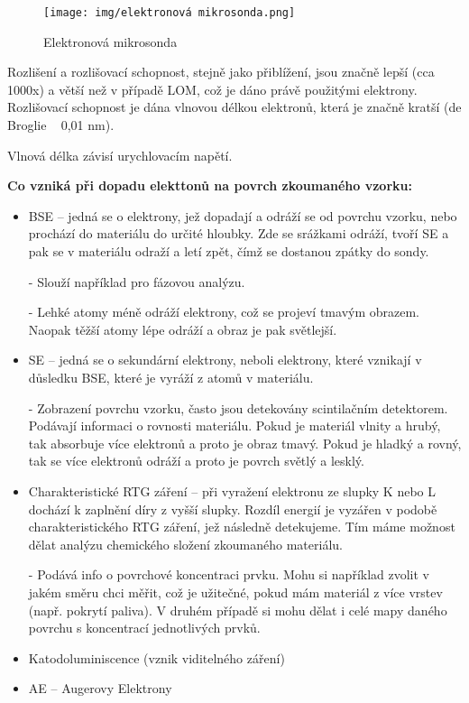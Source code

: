 \begin{figure}[H]
    \centering
    \texttt{[image: img/elektronová mikrosonda.png]}
    \caption{Elektronová mikrosonda}
\end{figure}

Rozlišení a rozlišovací schopnost, stejně jako přiblížení, jsou značně lepší (cca 1000x) a větší než v případě LOM, což je dáno právě použitými elektrony. Rozlišovací schopnost je dána vlnovou délkou elektronů, která je značně kratší (de Broglie ~ 0,01 nm). 

Vlnová délka závisí urychlovacím napětí.

\textbf{Co vzniká při dopadu elekttonů na povrch zkoumaného vzorku:}

\begin{itemize}
    \item BSE -- jedná se o elektrony, jež dopadají a odráží se od povrchu vzorku, nebo prochází do materiálu do určité hloubky. Zde se srážkami odráží, tvoří SE a pak se v materiálu odraží a letí zpět, čímž se dostanou zpátky do sondy.
    \item[-] Slouží například pro fázovou analýzu.
    \item[-] Lehké atomy méně odráží elektrony, což se projeví tmavým obrazem. Naopak těžší atomy lépe odráží a obraz je pak světlejší.
    \item  SE -- jedná se o sekundární elektrony, neboli elektrony, které vznikají v důsledku BSE, které je vyráží z atomů v materiálu.
    \item[-] Zobrazení povrchu vzorku, často jsou detekovány scintilačním detektorem. Podávají informaci o rovnosti materiálu. Pokud je materiál vlnity a hrubý, tak absorbuje více elektronů a proto je obraz tmavý. Pokud je hladký a rovný, tak se více elektronů odráží a proto je povrch světlý a lesklý.
    \item Charakteristické RTG záření -- při vyražení elektronu ze slupky K nebo L dochází k zaplnění díry z vyšší slupky. Rozdíl energií je vyzářen v podobě charakteristického RTG záření, jež následně detekujeme. Tím máme možnost dělat analýzu chemického složení zkoumaného materiálu.
    \item[-] Podává info o povrchové koncentraci prvku. Mohu si například zvolit v jakém směru chci měřit, což je užitečné, pokud mám materiál z více vrstev (např. pokrytí paliva). V druhém případě si mohu dělat i celé mapy daného povrchu s koncentrací jednotlivých prvků.
    \item Katodoluminiscence (vznik viditelného záření)
    \item AE -- Augerovy Elektrony
\end{itemize}


